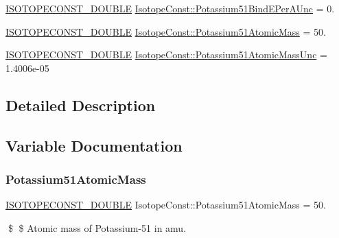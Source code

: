 \begin{DoxyCompactItemize}
\mbox{\hyperlink{group___isotope_const-_macros_ga8f45a7272ce02c0b4c65c44636ed719a}{I\+S\+O\+T\+O\+P\+E\+C\+O\+N\+S\+T\+\_\+\+D\+O\+U\+B\+LE}} \mbox{\hyperlink{group___isotope_const-_potassium-_k51_gab8973f9fa065cbe97675b1dfb3ab363a}{Isotope\+Const\+::\+Potassium51\+Bind\+E\+Per\+A\+Unc}} = 0.
\item 
\mbox{\hyperlink{group___isotope_const-_macros_ga8f45a7272ce02c0b4c65c44636ed719a}{I\+S\+O\+T\+O\+P\+E\+C\+O\+N\+S\+T\+\_\+\+D\+O\+U\+B\+LE}} \mbox{\hyperlink{group___isotope_const-_potassium-_k51_gab7efa5517f6b975ae87865227c9bae04}{Isotope\+Const\+::\+Potassium51\+Atomic\+Mass}} = 50.
\item 
\mbox{\hyperlink{group___isotope_const-_macros_ga8f45a7272ce02c0b4c65c44636ed719a}{I\+S\+O\+T\+O\+P\+E\+C\+O\+N\+S\+T\+\_\+\+D\+O\+U\+B\+LE}} \mbox{\hyperlink{group___isotope_const-_potassium-_k51_gaf5492f834f8e79c014cc5bfe734710bc}{Isotope\+Const\+::\+Potassium51\+Atomic\+Mass\+Unc}} = 1.\+4006e-\/05
\end{DoxyCompactItemize}


\subsection{Detailed Description}


\subsection{Variable Documentation}
\mbox{\label{group___isotope_const-_potassium-_k51_gab7efa5517f6b975ae87865227c9bae04}} 
\subsubsection{\texorpdfstring{Potassium51\+Atomic\+Mass}{Potassium51AtomicMass}}
{\footnotesize\ttfamily \mbox{\hyperlink{group___isotope_const-_macros_ga8f45a7272ce02c0b4c65c44636ed719a}{I\+S\+O\+T\+O\+P\+E\+C\+O\+N\+S\+T\+\_\+\+D\+O\+U\+B\+LE}} Isotope\+Const\+::\+Potassium51\+Atomic\+Mass = 50.}

\$ \$ Atomic mass of Potassium-\/51 in amu. \mbox{\label{group___isotope_const-_potassium-_k51_gaf5492f834f8e79c014cc5bfe734710bc}} 
